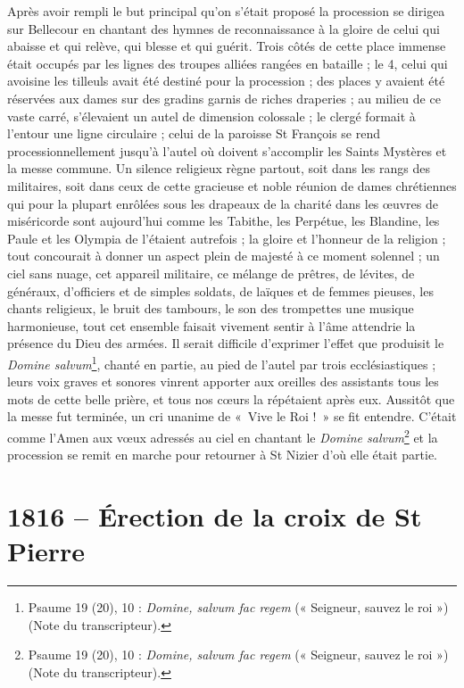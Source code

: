 \documentclass[11pt,a4paper]{report}
\begin{document}
Après avoir rempli le but principal qu'on s'était proposé la procession se dirigea sur Bellecour en chantant des hymnes de reconnaissance à la gloire de celui qui abaisse et qui relève, qui blesse et qui guérit. Trois côtés de cette place immense était occupés par les lignes des troupes alliées rangées en bataille ; le 4, celui qui avoisine les tilleuls avait été destiné pour la procession ; des places y avaient été réservées aux dames sur des gradins garnis de riches draperies ; au milieu de ce vaste carré, s'élevaient un autel de dimension colossale ; le clergé formait à l'entour une ligne circulaire ; celui de la paroisse St François se rend processionnellement jusqu'à l'autel où doivent s'accomplir les Saints Mystères et la messe commune. Un silence religieux règne partout, soit dans les rangs des militaires, soit dans ceux de cette gracieuse et noble réunion de dames chrétiennes qui pour la plupart enrôlées sous les drapeaux de la charité dans les œuvres de miséricorde sont aujourd'hui comme les Tabithe, les Perpétue, les Blandine, les Paule et les Olympia de l'étaient autrefois ; la gloire et l'honneur de la religion ; tout concourait à donner un aspect plein de majesté à ce moment solennel ; un ciel sans nuage, cet appareil militaire, ce mélange de prêtres, de lévites, de généraux, d'officiers et de simples soldats, de laïques et de femmes pieuses, les chants religieux, le bruit des tambours, le son des trompettes une musique harmonieuse, tout cet ensemble faisait vivement sentir à l'âme attendrie la présence du Dieu des armées. Il serait difficile d'exprimer l'effet que produisit le \textit{Domine salvum}\footnote{Psaume 19 (20), 10 : \textit{Domine, salvum fac regem} (« Seigneur, sauvez le roi ») (Note du transcripteur).}, chanté en partie, au pied de l'autel par trois ecclésiastiques ; leurs voix graves et sonores vinrent apporter aux oreilles des assistants tous les mots de cette belle prière, et tous nos cœurs la répétaient après eux. Aussitôt que la messe fut terminée, un cri unanime de «~Vive le Roi !~» se fit entendre. C'était comme l'Amen aux vœux adressés au ciel en chantant le \textit{Domine salvum}\footnote{Psaume 19 (20), 10 : \textit{Domine, salvum fac regem} (« Seigneur, sauvez le roi ») (Note du transcripteur).} et la procession se remit en marche pour retourner à St Nizier d'où elle était partie.

\section*{1816 -- Érection de la croix de St Pierre}
\end{document}
